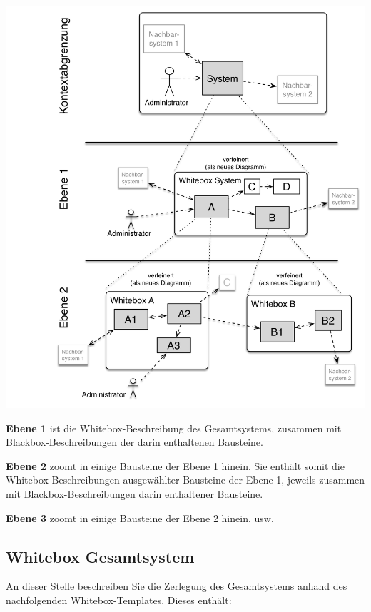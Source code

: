 \documentclass[]{article}
\begin{document}
\includegraphics{images/05_building_blocks-DE.png}

\textbf{Ebene 1} ist die Whitebox-Beschreibung des Gesamtsystems,
zusammen mit Blackbox-Beschreibungen der darin enthaltenen Bausteine.

\textbf{Ebene 2} zoomt in einige Bausteine der Ebene 1 hinein. Sie
enthält somit die Whitebox-Beschreibungen ausgewählter Bausteine der
Ebene 1, jeweils zusammen mit Blackbox-Beschreibungen darin enthaltener
Bausteine.

\textbf{Ebene 3} zoomt in einige Bausteine der Ebene 2 hinein, usw.

\hypertarget{_whitebox_gesamtsystem}{%
\subsection{Whitebox Gesamtsystem}\label{_whitebox_gesamtsystem}}

An dieser Stelle beschreiben Sie die Zerlegung des Gesamtsystems anhand
des nachfolgenden Whitebox-Templates. Dieses enthält:
\end{document}
